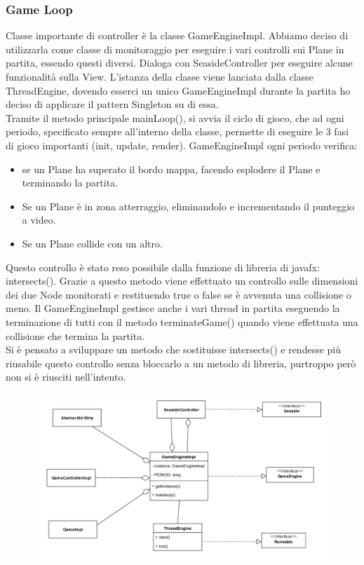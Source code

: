 \documentclass[a4paper,12pt]{report}
\begin{document}
\subsubsection{Game Loop}
Classe importante di controller è la classe GameEngineImpl.
Abbiamo deciso di utilizzarla come classe di monitoraggio per eseguire i vari controlli sui Plane in partita, essendo questi diversi.
Dialoga con SeasideController per eseguire alcune funzionalità sulla View.
L’istanza della classe viene lanciata dalla classe ThreadEngine, dovendo esserci un unico GameEngineImpl durante la partita ho deciso 
di applicare il pattern Singleton su di essa.
\\
Tramite il metodo principale mainLoop(), si avvia il ciclo di gioco, che ad ogni periodo, specificato sempre all’interno della classe, 
permette di eseguire le 3 fasi di gioco importanti (init, update, render).
GameEngineImpl ogni periodo verifica:
\begin{itemize}
	\item se un Plane ha superato il bordo mappa, facendo esplodere il Plane e terminando la partita.
	\item Se un Plane è in zona atterraggio, eliminandolo e incrementando il punteggio a video.
	\item Se un Plane collide con un altro.
\end{itemize}

\noindent Questo controllo è stato reso possibile dalla funzione di libreria di javafx: intersects().
Grazie a questo metodo viene effettuato un controllo sulle dimensioni dei due Node monitorati e restituendo true o false se è avvenuta una 
collisione o meno.
Il GameEngineImpl gestisce anche i vari thread in partita eseguendo la terminazione di tutti con il metodo terminateGame() quando viene 
effettuata una collisione che termina la partita.
\\
Si è pensato a sviluppare un metodo che sostituisse intersects() e rendesse più riusabile questo controllo senza bloccarlo a un metodo di 
libreria, purtroppo però non si è riusciti nell’intento.
\begin{figure}[H]
    \begin{center}
        \centering
        \includegraphics[width=\textwidth]{img/Design/Rodilosso/GameEngine.png}
    \end{center}
    \label{img:game-engine}
\end{figure}
\end{document}
